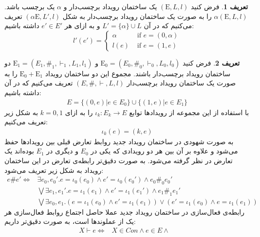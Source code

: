 \documentclass[
msc,
irfonts
]{./tex/tehran-thesis}
\newcommand{\پ}{پروژه/پایان‌نامه/رساله }
\theoremstyle{definition}
\newtheorem{definition}{تعریف}[section]
\theoremstyle{theorem}
\theoremstyle{definition}
\numberwithin{algorithm}{chapter}
\newcommand{\s}[1]{\{#1\}}
\newcommand{\ra}{\rightarrow}
\newcommand{\mr}[1]{\mathrm{#1}}
\begin{document}
\begin{definition}
    فرض کنید
    $(\mr{E},L,l)$
    یک ساختمان رویداد برچسب‌دار و
    $\alpha$
    یک برچسب باشد.
    $\alpha(\mr{E},L,l)$
    را به صورت یک ساختمان رویداد برچسب‌دار به شکل
    $(\alpha \mr{E},L',l)$
    تعریف می‌کنیم که در آن
    $L' = \s{\alpha}\cup L$
    و به ازای هر
    $e' \in E'$
    داشته باشیم:
    $$
        l'(e') = \begin{cases}
            \alpha & \text{ if } e = (0,\alpha) \\
            l(e)   & \text{ if } e = (1,e)
        \end{cases}
    $$
\end{definition}
\begin{definition}
    فرض کنید
    $\mr{E}_0 = (E_0,\#_0,\vdash_0,L_0,l_0)$
    و
    $\mr{E}_1 = (E_1,\#_1,\vdash_1,L_1,l_1)$
    دو ساختمان رویداد برچسب‌دار باشند.
    مجموع این دو ساختمان رویداد
    $\mr{E}_0 + \mr{E}_1$
    را به صورت یک ساختمان رویداد برچسب‌دار
    $(E,\#,\vdash,L,l)$
    تعریف می‌کنیم که در آن داشته باشیم:
    \begin{align*}
        E = \s{(0,e)|e \in E_0} \cup \s{(1,e)|e \in E_1}
    \end{align*}
    با استفاده از این مجموعه از رویداد‌ها توابع
    $\iota_k: E_k \ra E$
    را به ازای
    $k=0,1$
    به شکل زیر تعریف می‌کنیم:
    \begin{align*}
        \iota_k(e) = (k,e)
    \end{align*}
    به صورت شهودی در ساختمان رویداد جدید روابط تعارض قبلی بین رویداد‌ها حفظ می‌شود و علاوه بر آن
    بین هر دو رویدادی که یکی در
    $E_0$
    و دیگری در
    $E_1$
    بوده‌‌اند یک تعارض در نظر گرفته می‌شود.
    به صورت دقیق‌تر رابطه‌ی تعارض در این ساختمان رویداد به شکل زیر تعریف می‌شود:
    \begin{align*}
        e \# e' \iff & \exists e_0,e_0'. e = \iota_0(e_0)
        \wedge e' = \iota_0(e_0') \wedge e_0 \#_0e_0'             \\
                     & \bigvee \exists e_1,e_1'. e = \iota_1(e_1)
        \wedge e' = \iota_1(e_1') \wedge e_1 \#_1 e_1'            \\
                     & \bigvee \exists e_0,e_1.(e=\iota_1(e_0)
        \wedge e' =\iota_1(e_1)) \vee
        (e'=\iota_1(e_0) \wedge e =\iota_1(e_1))
    \end{align*}
    رابطه‌ی فعال‌سازی در ساختمان رویداد جدید عملا حاصل اجتماع روابط فعال‌سازی هر یک از عملوند‌ها است، به صورت دقیق‌تر داریم:
    \begin{align*}
        X \vdash e \iff & X \in Con \wedge e \in E \wedge                   & \\

\end{align*}
\end{definition}
\end{document}
